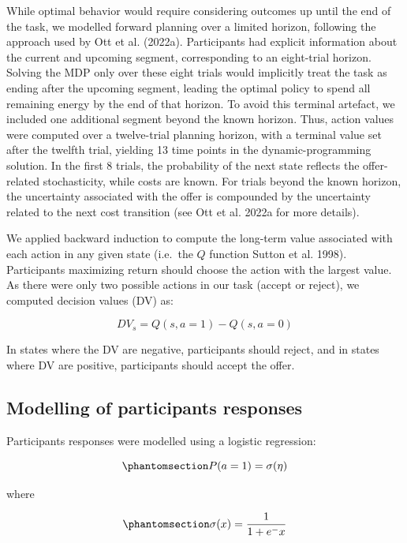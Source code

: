 \documentclass[
  letterpaper,
  DIV=11,
  numbers=noendperiod]{scrartcl}
\begin{document}
While optimal behavior would require considering outcomes up until the
end of the task, we modelled forward planning over a limited horizon,
following the approach used by Ott et al. (2022a). Participants had
explicit information about the current and upcoming segment,
corresponding to an eight-trial horizon. Solving the MDP only over these
eight trials would implicitly treat the task as ending after the
upcoming segment, leading the optimal policy to spend all remaining
energy by the end of that horizon. To avoid this terminal artefact, we
included one additional segment beyond the known horizon. Thus, action
values were computed over a twelve-trial planning horizon, with a
terminal value set after the twelfth trial, yielding 13 time points in
the dynamic-programming solution. In the first 8 trials, the probability
of the next state reflects the offer-related stochasticity, while costs
are known. For trials beyond the known horizon, the uncertainty
associated with the offer is compounded by the uncertainty related to
the next cost transition (see Ott et al. 2022a for more details).

We applied backward induction to compute the long-term value associated
with each action in any given state (i.e.~the \(Q\) function {Sutton et
al.} 1998). Participants maximizing return should choose the action with
the largest value. As there were only two possible actions in our task
(accept or reject), we computed decision values (DV) as:

\[
DV_s = Q(s, a=1) - Q(s, a=0)
\]

In states where the DV are negative, participants should reject, and in
states where DV are positive, participants should accept the offer.

\subsection{Modelling of participants
responses}\label{sec-choice-behavior-modeling-method}

Participants responses were modelled using a logistic regression:

\begin{equation}\protect\phantomsection\label{eq-logistic_reg}{
P(a=1) = \sigma(\eta)
}\end{equation}

where

\begin{equation}\protect\phantomsection\label{eq-logistic_sigmoid}{
\sigma(x)=\frac{1}{1+e^-x}
}\end{equation}
\end{document}
